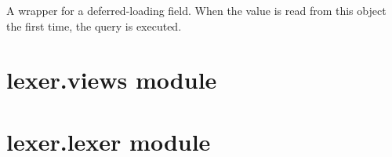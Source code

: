 \documentclass[letterpaper,10pt,english]{sphinxmanual}
\begin{document}
\begin{fulllineitems}

\begin{fulllineitems}
\label{\detokenize{index:lexer.models.File.objects}}
\end{fulllineitems}


\begin{fulllineitems}
\label{\detokenize{index:lexer.models.File.title}}
A wrapper for a deferred-loading field. When the value is read from this
object the first time, the query is executed.

\end{fulllineitems}


\end{fulllineitems}



\chapter{lexer.views module}
\label{\detokenize{index:module-lexer.views}}\label{\detokenize{index:lexer-views-module}}

\begin{fulllineitems}
\label{\detokenize{index:lexer.views.complie}}
\end{fulllineitems}



\chapter{lexer.lexer module}
\label{\detokenize{index:module-lexer.lexer}}\label{\detokenize{index:lexer-lexer-module}}
\end{document}
